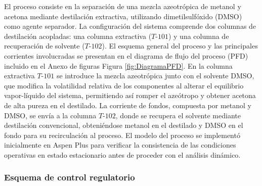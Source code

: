 El proceso consiste en la separación de una mezcla azeotrópica de metanol y acetona mediante destilación extractiva, utilizando dimetilsulfóxido (DMSO) como agente separador. La configuración del sistema comprende dos columnas de destilación acopladas: una columna extractiva ($T\text{-}101$) y una columna de recuperación de solvente ($T\text{-}102$). El esquema general del proceso y las principales corrientes involucradas se presentan en el diagrama de flujo del proceso (PFD) incluido en el Anexo de figuras Figura \ref{fig:DiagramaPFD}. En la columna extractiva $T\text{-}101$ se introduce la mezcla azeotrópica junto con el solvente DMSO, que modifica la volatilidad relativa de los componentes al alterar el equilibrio vapor-líquido del sistema, permitiendo así romper el azeótropo y obtener acetona de alta pureza en el destilado. La corriente de fondos, compuesta por metanol y DMSO, se envía a la columna $T\text{-}102$, donde se recupera el solvente mediante destilación convencional, obteniéndose metanol en el destilado y DMSO en el fondo para su recirculación al proceso. El modelo del proceso se implementó inicialmente en Aspen Plus para verificar la consistencia de las condiciones operativas en estado estacionario antes de proceder con el análisis dinámico.

\subsubsection{Esquema de control regulatorio}

